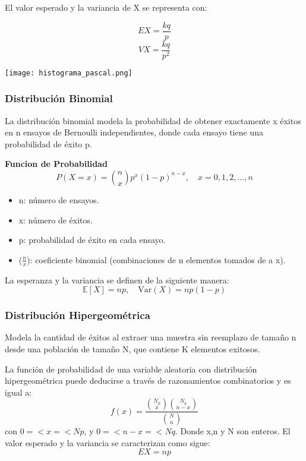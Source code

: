 \documentclass[11pt]{article}
\begin{document}
  El valor esperado y la variancia de X se representa con:

  \begin{equation}
    EX = \frac{kq}{p}
  \end{equation}
  \begin{equation}
    VX = \frac{kq}{p^2}
  \end{equation}

\begin{center}
\texttt{[image: histograma\_pascal.png]}
\end{center}
  

\subsubsection{Distribución Binomial}
La distribución binomial modela la probabilidad de obtener exactamente x éxitos en n ensayos de Bernoulli independientes, donde cada ensayo tiene una probabilidad de éxito p.

\noindent\textbf{Funcion de Probabilidad\newline}
\[
P(X = x) = \binom{n}{x} p^x (1 - p)^{n - x}, \quad x = 0, 1, 2, \dots, n
\]
\begin{itemize}
    \item n: número de ensayos.
    \item x: número de éxitos.
    \item p: probabilidad de éxito en cada ensayo. 
    \item ($\frac{n}{x}$): coeficiente binomial (combinaciones de n elementos tomados de a x).
\end{itemize}
La esperanza y la variancia se definen de la siguiente manera:
\[
\mathbb{E}[X] = np, \quad \text{Var}(X) = np(1 - p)
\]

\subsubsection{Distribución Hipergeométrica}
Modela la cantidad de éxitos al extraer una muestra sin reemplazo de tamaño n desde una población de tamaño N, que contiene K elementos exitosos.

La función de probabilidad de una variable aleatoria con distribución hipergeométrica puede deducirse a través de razonamientos combinatorios y es igual a:
\begin{equation}
    f(x) = \frac{\binom{N_{p}}{x}\binom{N_{q}}{n-x}}{\binom{N}{n}}
    \end{equation}
  con $0 =< x =< Np$, y $0 =< n-x =<Nq$. Donde x,n y N son enteros. El valor esperado y la variancia se caracterizan como sigue:
  \begin{equation}
    EX = np
    \end{equation}
\end{document}
